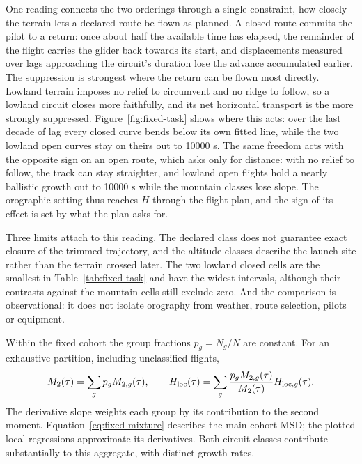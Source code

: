 One reading connects the two orderings through a single constraint, how closely the
terrain lets a declared route be flown as planned. A closed route commits the pilot to a
return: once about half the available time has elapsed, the remainder of the flight
carries the glider back towards its start, and displacements measured over lags
approaching the circuit's duration lose the advance accumulated earlier. The suppression
is strongest where the return can be flown most directly. Lowland terrain imposes no
relief to circumvent and no ridge to follow, so a lowland circuit closes more faithfully,
and its net horizontal transport is the more strongly suppressed. Figure~\ref{fig:fixed-task}
shows where this acts: over the last decade of lag every closed curve bends below its own
fitted line, while the two lowland open curves stay on theirs out to 10000 s. The same freedom
acts with the opposite sign on an open route, which asks only for distance: with no
relief to follow, the track can stay straighter, and lowland open
flights hold a nearly ballistic growth out to 10000 s while the mountain classes lose
slope. The orographic setting thus reaches $H$ through the flight plan, and the sign of
its effect is set by what the plan asks for.

Three limits attach to this reading. The declared class does not guarantee exact closure
of the trimmed trajectory, and the altitude classes describe the launch site rather than
the terrain crossed later. The two lowland closed cells are the smallest in
Table~\ref{tab:fixed-task} and have the widest intervals, although their contrasts
against the mountain cells still exclude zero. And the comparison is observational: it
does not isolate orography from weather, route selection, pilots or equipment.

Within the fixed cohort the group fractions $p_g=N_g/N$ are constant. For an
exhaustive partition, including unclassified flights,
\begin{equation}
 M_2(\tau)=\sum_g p_g M_{2,g}(\tau),\qquad
 H_{\rm loc}(\tau)=\sum_g
 \frac{p_gM_{2,g}(\tau)}{M_2(\tau)}H_{{\rm loc},g}(\tau).
 \label{eq:fixed-mixture}
\end{equation}
The derivative slope weights each group by its contribution to the second moment.
Equation~\eqref{eq:fixed-mixture} describes the main-cohort MSD; the plotted local
regressions approximate its derivatives. Both circuit classes contribute substantially
to this aggregate, with distinct growth rates.

